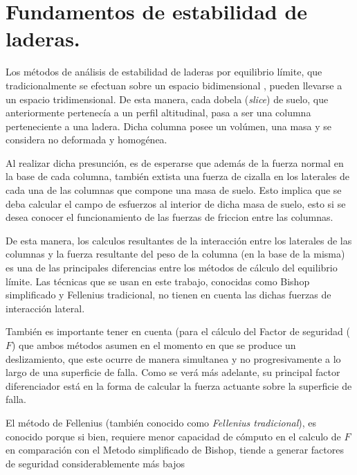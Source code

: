 \chapter{Fundamentos de estabilidad de laderas.}

Los m\'etodos de an\'alisis de estabilidad de laderas por equilibrio l\'imite, que tradicionalmente se efectuan sobre un espacio bidimensional \cite{fredlund1977comparison} , pueden llevarse a un espacio tridimensional. 
De esta manera, cada dobela (\textit{slice}) de suelo, que anteriormente pertenec\'ia a un perfil altitudinal, pasa a ser una columna perteneciente a una ladera. Dicha columna posee un vol\'umen, una masa y se considera no deformada y homog\'enea.

Al realizar dicha presunci\'on, es de esperarse que adem\'as de la fuerza normal en la base de cada columna, tambi\'en extista una fuerza de cizalla en los laterales de cada una de las columnas que compone una masa de suelo. Esto implica que se deba calcular el campo de esfuerzos al interior de dicha masa de suelo, esto si se desea conocer el funcionamiento de las fuerzas de friccion entre las columnas.\cite{reid2015scoops3d}

De esta manera, los calculos resultantes de la interacci\'on entre los laterales de las columnas y la fuerza resultante del peso de la columna (en la base de la misma) es una de las principales diferencias entre los m\'etodos de c\'alculo del equilibrio l\'imite. Las t\'ecnicas que se usan en este trabajo, conocidas como Bishop simplificado y Fellenius tradicional, no tienen en cuenta las dichas fuerzas de interacci\'on lateral.

Tambi\'en es importante tener en cuenta (para el c\'alculo del Factor de seguridad (\(F\)) que ambos m\'etodos asumen en el momento en que se produce un deslizamiento, que este ocurre de manera simultanea y no progresivamente a lo largo de una superficie de falla. Como se ver\'a m\'as adelante, su principal factor diferenciador est\'a en la forma de calcular la fuerza actuante sobre la superficie de falla.

El m\'etodo de Fellenius (tambi\'en conocido como  \emph{Fellenius tradicional}), es conocido porque si bien, requiere menor capacidad de c\'omputo en el calculo de \(F\) en comparaci\'on con el Metodo simplificado de Bishop, tiende a generar factores de seguridad considerablemente m\'as bajos \cite{traditional}
